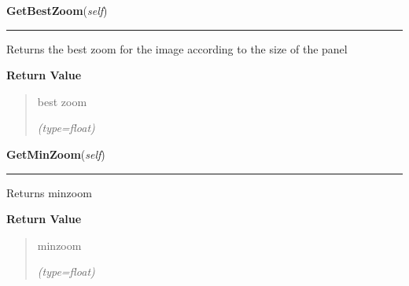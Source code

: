     \label{ImagePanel:ImagePanel:GetBestZoom}

    \vspace{0.5ex}

\hspace{.8\funcindent}\begin{boxedminipage}{\funcwidth}

    \raggedright \textbf{GetBestZoom}(\textit{self})

    \vspace{-1.5ex}

    \rule{\textwidth}{0.5\fboxrule}
\setlength{\parskip}{2ex}
    Returns the best zoom for the image according to the size of the panel

\setlength{\parskip}{1ex}
      \textbf{Return Value}
    \vspace{-1ex}

      \begin{quote}
      best zoom

      {\it (type=float)}

      \end{quote}

    \end{boxedminipage}

    \label{ImagePanel:ImagePanel:GetMinZoom}

    \vspace{0.5ex}

\hspace{.8\funcindent}\begin{boxedminipage}{\funcwidth}

    \raggedright \textbf{GetMinZoom}(\textit{self})

    \vspace{-1.5ex}

    \rule{\textwidth}{0.5\fboxrule}
\setlength{\parskip}{2ex}
    Returns minzoom

\setlength{\parskip}{1ex}
      \textbf{Return Value}
    \vspace{-1ex}

      \begin{quote}
      minzoom

      {\it (type=float)}

      \end{quote}

    \end{boxedminipage}

